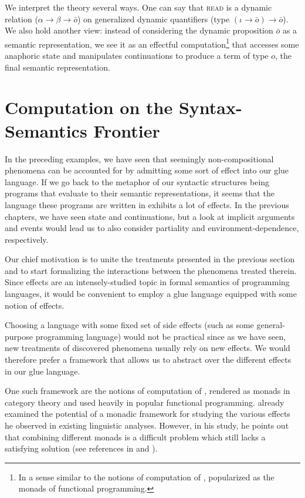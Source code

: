 \documentclass{article}
\begin{document}
We interpret the theory several ways. One can say that \textsc{read} is a
dynamic relation ($\alpha \to \beta \to \bar{o}$) on generalized dynamic
quantifiers (type $(\iota \to \bar{o}) \to \bar{o}$). We also hold another
view: instead of considering the dynamic proposition $\bar{o}$ as a semantic
representation, we see it as an effectful computation\footnote{In a sense
  similar to the notions of computation of \citet{moggi1991notions},
  popularized as the monads of functional programming.} that accesses some
anaphoric state and manipulates continuations to produce a term of type $o$,
the final semantic representation.


\section{Computation on the Syntax-Semantics Frontier}

In the preceding examples, we have seen that seemingly non-compositional
phenomena can be accounted for by admitting some sort of effect into our glue
language. If we go back to the metaphor of our syntactic structures being
programs that evaluate to their semantic representations, it seems that the
language these programs are written in exhibits a lot of effects. In the
previous chapters, we have seen state and continuations, but a look at
implicit arguments and events would lead us to also consider partiality and
environment-dependence, respectively.

Our chief motivation is to unite the treatments presented in the previous
section and to start formalizing the interactions between the phenomena
treated therein. Since effects are an intensely-studied topic in formal
semantics of programming languages, it would be convenient to employ a glue
language equipped with some notion of effects.

Choosing a language with some fixed set of side effects (such as some
general-purpose programming language) would not be practical since as we have
seen, new treatments of discovered phenomena usually rely on new effects. We
would therefore prefer a framework that allows us to abstract over the
different effects in our glue language.

One such framework are the notions of computation of
\citet{moggi1991notions}, rendered as monads in category theory and used
heavily in popular functional programming. \citet{shan2002monads} already
examined the potential of a monadic framework for studying the various effects
he observed in existing linguistic analyses. However, in his study, he points
out that combining different monads is a difficult problem which still lacks a
satisfying solution (see references in \cite{shan2002monads} and
\citet{kammar2013handlers}).
\end{document}
